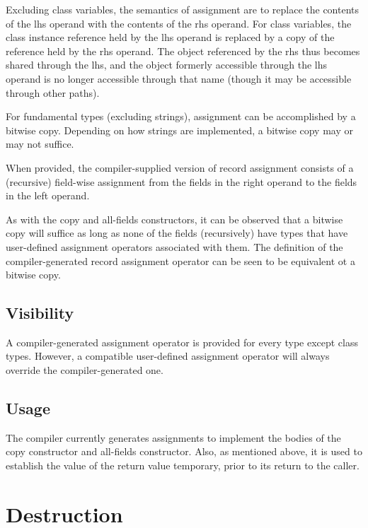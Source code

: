 Excluding class variables, the semantics of assignment are to replace the
contents of the lhs operand with the contents of the rhs operand.  For class
variables, the class instance reference held by the lhs operand is replaced by a
copy of the reference held by the rhs operand.  The object referenced by the rhs
thus becomes shared through the lhs, and the object formerly accessible through
the lhs operand is no longer accessible through that name (though it may be
accessible through other paths).

For fundamental types (excluding strings),
assignment can be accomplished by a bitwise copy.  
Depending on how strings are implemented, a bitwise copy may or may not suffice.

When provided, the compiler-supplied version of record assignment consists of a
(recursive) field-wise assignment from the fields in the right operand to the
fields in the left operand.

\begin{note}

As with the copy and all-fields constructors, it can be observed that a bitwise
copy will suffice as long as none of the fields (recursively) have types that
have user-defined assignment operators associated with them.  The definition of
the compiler-generated record assignment operator can be seen to be equivalent
ot a bitwise copy.

\end{note}

\subsection{Visibility}

A compiler-generated assignment operator is provided for every type except class
types.  However, a compatible user-defined assignment operator will always
override the compiler-generated one.

\subsection{Usage}

The compiler currently generates assignments to implement the bodies of the copy
constructor and all-fields constructor.  Also, as mentioned above, it is used
to establish the value of the return value temporary, prior to its return to the
caller.



\section{Destruction}

